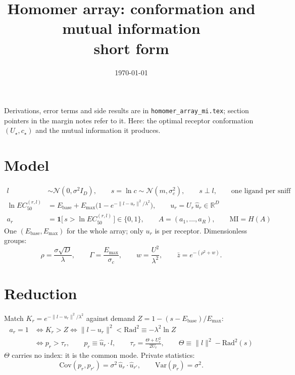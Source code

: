 \documentclass[11pt,a4paper]{article}
\title{Homomer array: conformation and mutual information\\[2pt]
\large short form}
\author{}
\date{\today}
\newcommand{\RR}{\mathbb{R}}
\newcommand{\Var}{\mathrm{Var}}
\newcommand{\Cov}{\mathrm{Cov}}
\newcommand{\Ebase}{E_{\mathrm{base}}}
\newcommand{\Emax}{E_{\mathrm{max}}}
\newcommand{\uhat}{\hat{u}}
\begin{document}
\maketitle
\vspace{-2em}

\noindent
Derivations, error terms and side results are in \texttt{homomer\_array\_mi.tex}; section
pointers in the margin notes refer to it. Here: the optimal receptor conformation
$(U_\star,c_\star)$ and the mutual information it produces.

\section{Model}

\begin{align}
  l &\sim \mathcal{N}(0,\sigma^2 I_D), \qquad s=\ln c \sim \mathcal{N}(m,\sigma_c^2),
    \qquad s\perp l, \qquad \text{one ligand per sniff} \\
  \ln EC_{50}^{(r,l)} &= \Ebase + \Emax\Big(1-e^{-\|l-u_r\|^2/\lambda^2}\Big),
    \qquad u_r = U_r\,\uhat_r \in\RR^D \\
  a_r &= \mathbf 1\big[\,s > \ln EC_{50}^{(r,l)}\,\big] \in\{0,1\},
    \qquad A=(a_1,\dots,a_R), \qquad \mathrm{MI}=H(A)
\end{align}
One $(\Ebase,\Emax)$ for the whole array; only $u_r$ is per receptor. Dimensionless groups:
\begin{equation}
  \rho=\frac{\sigma\sqrt D}{\lambda},
  \qquad
  \Gamma=\frac{\Emax}{\sigma_c},
  \qquad
  w=\frac{U^2}{\lambda^2},
  \qquad
  \bar z = e^{-(\rho^2+w)} .
\end{equation}

\section{Reduction}

Match $K_r=e^{-\|l-u_r\|^2/\lambda^2}$ against demand $Z=1-(s-\Ebase)/\Emax$:
\begin{align}
  a_r=1 &\iff K_r>Z \iff \|l-u_r\|^2 < \mathrm{Rad}^2 \equiv -\lambda^2\ln Z \\
        &\iff p_r > \tau_r,
  \qquad p_r\equiv\uhat_r\cdot l,
  \qquad \tau_r=\frac{\Theta+U_r^2}{2U_r},
  \qquad \Theta\equiv\|l\|^2-\mathrm{Rad}^2(s)
  \label{eq:red}
\end{align}
$\Theta$ carries no index: it is the common mode. Private statistics:
\begin{equation}
  \Cov(p_r,p_{r'})=\sigma^2\,\uhat_r\cdot\uhat_{r'},
  \qquad
  \Var(p_r)=\sigma^2 .
  \label{eq:gram}
\end{equation}
\end{document}

